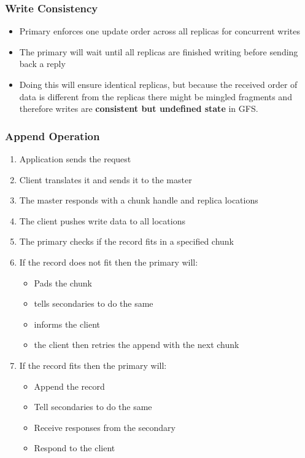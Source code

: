 \documentclass[12pt]{article}
\begin{document}
\subsubsection{Write Consistency}
\begin{itemize}
    \item Primary enforces one update order across all replicas for concurrent writes
    \item The primary will wait until all replicas are finished writing before sending back a reply
    \item Doing this will ensure identical replicas, but because the received order of data is different from the replicas there might be mingled fragments and therefore writes are \textbf{consistent but undefined state} in GFS.
\end{itemize}

\subsubsection{Append Operation}
\begin{enumerate}
    \item Application sends the request
    \item Client translates it and sends it to the master
    \item The master responds with a chunk handle and replica locations
    \item The client pushes write data to all locations
    \item The primary checks if the record fits in a specified chunk
    \item If the record does not fit then the primary will:
    \begin{itemize}
        \item Pads the chunk
        \item tells secondaries to do the same
        \item informs the client
        \item the client then retries the append with the next chunk
    \end{itemize}
    \item If the record fits then the primary will:
    \begin{itemize}
        \item Append the record
        \item Tell secondaries to do the same
        \item Receive responses from the secondary
        \item Respond to the client
    \end{itemize}
\end{enumerate}
\end{document}
